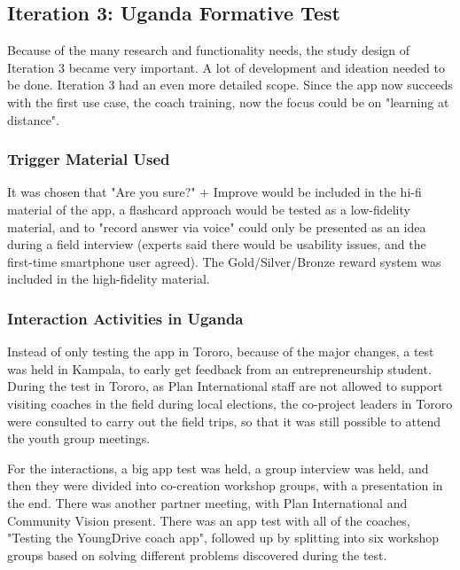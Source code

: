 \subsection{Iteration 3: Uganda Formative Test}\label{sec:sd-3}

Because of the many research and functionality needs, the study design of Iteration 3 became very important. A lot of development and ideation needed to be done. Iteration 3 had an even more detailed scope. Since the app now succeeds with the first use case, the coach training, now the focus could be on "learning at distance".

\subsubsection{Trigger Material Used}
It was chosen that "Are you sure?" + Improve would be included in the hi-fi material of the app, a flashcard approach would be tested as a low-fidelity material, and to "record answer via voice" could only be presented as an idea during a field interview (experts said there would be usability issues, and the first-time smartphone user agreed). The Gold/Silver/Bronze reward system was included in the high-fidelity material.

\subsubsection{Interaction Activities in Uganda}
Instead of only testing the app in Tororo, because of the major changes, a test was held in Kampala, to early get feedback from an entrepreneurship student. During the test in Tororo, as Plan International staff are not allowed to support visiting coaches in the field during local elections, the co-project leaders in Tororo were consulted to carry out the field trips, so that it was still possible to attend the youth group meetings.

For the interactions, a big app test was held, a group interview was held, and then they were divided into co-creation workshop groups, with a presentation in the end. There was another partner meeting, with Plan International and Community Vision present. There was an app test with all of the coaches, "Testing the YoungDrive coach app", followed up by splitting into six workshop groups based on solving different problems discovered during the test.


